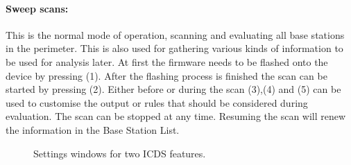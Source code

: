 \paragraph{Sweep scans:} This is the normal mode of operation, scanning and evaluating all base stations in the perimeter.
This is also used for gathering various kinds of information to be used for analysis later.
At first the firmware needs to be flashed onto the device by pressing (1).
After the flashing process is finished the scan can be started by pressing (2).
Either before or during the scan (3),(4) and (5) can be used to customise the output or rules that should be considered during evaluation.
The scan can be stopped at any time.
Resuming the scan will renew the information in the Base Station List.

\begin{figure}
\centering
{}
\caption{Settings windows for two ICDS features.}
\end{figure}

